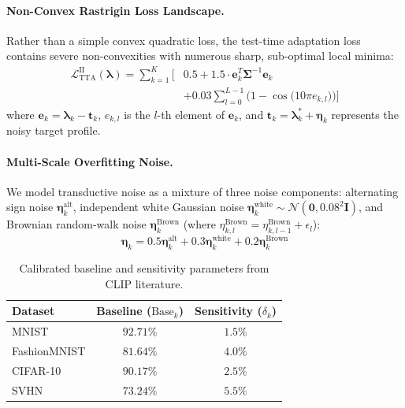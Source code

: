 \paragraph{Non-Convex Rastrigin Loss Landscape.} Rather than a simple convex quadratic loss, the test-time adaptation loss contains severe non-convexities with numerous sharp, sub-optimal local minima:
\begin{equation}
\label{eq:model2_loss}
\begin{aligned}
\mathcal{L}_{\text{TTA}}^{\text{II}}(\boldsymbol{\lambda}) = \sum_{k=1}^K \bigg[ &0.5 + 1.5 \cdot \mathbf{e}_k^T \boldsymbol{\Sigma}^{-1} \mathbf{e}_k \\
&+ 0.03 \sum_{l=0}^{L-1} \Big( 1 - \cos\big(10 \pi e_{k, l}\big) \Big) \bigg]
\end{aligned}
\end{equation}
where $\mathbf{e}_k = \boldsymbol{\lambda}_k - \mathbf{t}_k$, $e_{k, l}$ is the $l$-th element of $\mathbf{e}_k$, and $\mathbf{t}_k = \boldsymbol{\lambda}^*_k + \boldsymbol{\eta}_k$ represents the noisy target profile.

\paragraph{Multi-Scale Overfitting Noise.} We model transductive noise as a mixture of three noise components: alternating sign noise $\boldsymbol{\eta}_{k}^{\text{alt}}$, independent white Gaussian noise $\boldsymbol{\eta}_{k}^{\text{white}} \sim \mathcal{N}(\mathbf{0}, 0.08^2 \mathbf{I})$, and Brownian random-walk noise $\boldsymbol{\eta}_{k}^{\text{Brown}}$ (where $\eta_{k, l}^{\text{Brown}} = \eta_{k, l-1}^{\text{Brown}} + \epsilon_l$):
\begin{equation}
\boldsymbol{\eta}_k = 0.5 \boldsymbol{\eta}_{k}^{\text{alt}} + 0.3 \boldsymbol{\eta}_{k}^{\text{white}} + 0.2 \boldsymbol{\eta}_{k}^{\text{Brown}}
\end{equation}

\begin{table}[h]
\centering
\caption{Calibrated baseline and sensitivity parameters from CLIP literature.}
\label{tab:calibration}
\begin{small}
\begin{tabular}{lcc}
\toprule
Dataset & Baseline ($\text{Base}_k$) & Sensitivity ($\delta_k$) \\
\midrule
MNIST & $92.71\%$ & $1.5\%$ \\
FashionMNIST & $81.64\%$ & $4.0\%$ \\
CIFAR-10 & $90.17\%$ & $2.5\%$ \\
SVHN & $73.24\%$ & $5.5\%$ \\
\bottomrule
\end{tabular}
\end{small}
\end{table}

